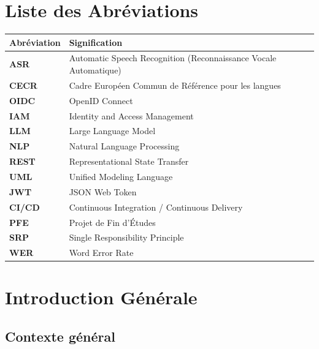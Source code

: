 \documentclass[12pt,a4paper]{report}
\begin{document}
\tableofcontents
{}

\listoffigures
{}

\listoftables
{}

\chapter*{Liste des Abréviations}

\begin{longtable}{>{\bfseries}p{3cm} p{10cm}}
\toprule
\textbf{Abréviation} & \textbf{Signification} \\
\midrule
\endhead
ASR & Automatic Speech Recognition (Reconnaissance Vocale Automatique) \\
CECR & Cadre Européen Commun de Référence pour les langues \\
OIDC & OpenID Connect \\
IAM & Identity and Access Management \\
LLM & Large Language Model \\
NLP & Natural Language Processing \\
REST & Representational State Transfer \\
UML & Unified Modeling Language \\
JWT & JSON Web Token \\
CI/CD & Continuous Integration / Continuous Delivery \\
PFE & Projet de Fin d'Études \\
SRP & Single Responsibility Principle \\
WER & Word Error Rate \\
\bottomrule
\end{longtable}

\chapter{Introduction Générale}

\section{Contexte général}
\end{document}
